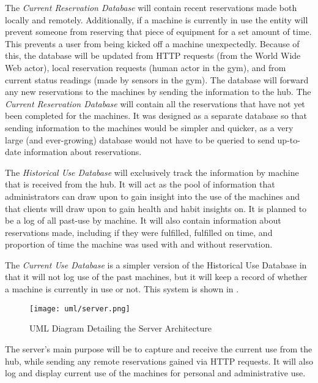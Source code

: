 \documentclass[PPFS.tex]{template/subfiles}
\newcommand{\sn}[1]{\textit{#1}}
\begin{document}
The \sn{Current Reservation Database} will contain recent reservations made both locally and remotely. Additionally, if a machine is currently in use the entity will prevent someone from reserving that piece of equipment for a set amount of time. This prevents a user from being kicked off a machine unexpectedly. Because of this, the database will be updated from HTTP requests (from the World Wide Web actor), local reservation requests (human actor in the gym), and from current status readings (made by sensors in the gym). The database will forward any new reservations to the machines by sending the information to the hub. The \sn{Current Reservation Database} will contain all the reservations that have not yet been completed for the machines. It was designed as a separate database so that sending information to the machines would be simpler and quicker, as a very large (and ever-growing) database would not have to be queried to send up-to-date information about reservations.

The \sn{Historical Use Database} will exclusively track the information by machine that is received from the hub. It will act as the pool of information that administrators can draw upon to gain insight into the use of the machines and that clients will draw upon to gain health and habit insights on. It is planned to be a log of all past-use by machine. It will also contain information about reservations made, including if they were fulfilled, fulfilled on time, and proportion of time the machine was used with and without reservation.

The \sn{Current Use Database} is a simpler version of the Historical Use Database in that it will not log use of the past machines, but it will keep a record of whether a machine is currently in use or not. This system is shown in .

\begin{figure}[H]
    \centering
    \texttt{[image: uml/server.png]}
    \caption{UML Diagram Detailing the Server Architecture}
    \label{fig:server_arch}
\end{figure}

The server's main purpose will be to capture and receive the current use from the hub, while sending any remote reservations gained via HTTP requests. It will also log and display current use of the machines for personal and administrative use.
\end{document}
